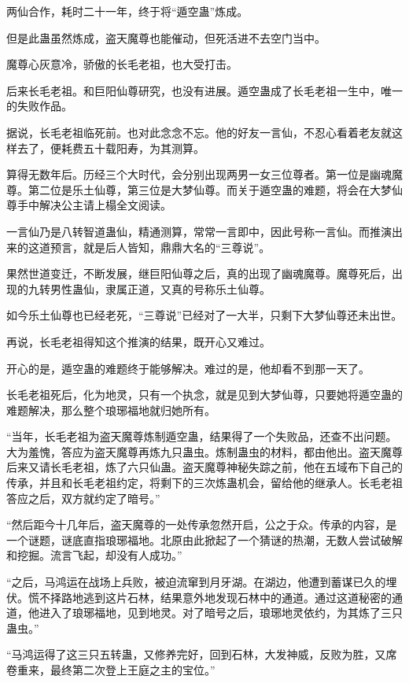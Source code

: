 \begin{this_body}
两仙合作，耗时二十一年，终于将“遁空蛊”炼成。

但是此蛊虽然炼成，盗天魔尊也能催动，但死活进不去空门当中。

魔尊心灰意冷，骄傲的长毛老祖，也大受打击。

后来长毛老祖。和巨阳仙尊研究，也没有进展。遁空蛊成了长毛老祖一生中，唯一的失败作品。

据说，长毛老祖临死前。也对此念念不忘。他的好友一言仙，不忍心看着老友就这样去了，便耗费五十载阳寿，为其测算。

算得无数年后。历经三个大时代，会分别出现两男一女三位尊者。第一位是幽魂魔尊。第二位是乐土仙尊，第三位是大梦仙尊。而关于遁空蛊的难题，将会在大梦仙尊手中解决公主请上榻全文阅读。

一言仙乃是八转智道蛊仙，精通测算，常常一言即中，因此号称一言仙。而推演出来的这道预言，就是后人皆知，鼎鼎大名的“三尊说”。

果然世道变迁，不断发展，继巨阳仙尊之后，真的出现了幽魂魔尊。魔尊死后，出现的九转男性蛊仙，隶属正道，又真的号称乐土仙尊。

如今乐土仙尊也已经老死，“三尊说”已经对了一大半，只剩下大梦仙尊还未出世。

再说，长毛老祖得知这个推演的结果，既开心又难过。

开心的是，遁空蛊的难题终于能够解决。难过的是，他却看不到那一天了。

长毛老祖死后，化为地灵，只有一个执念，就是见到大梦仙尊，只要她将遁空蛊的难题解决，那么整个琅琊福地就归她所有。

“当年，长毛老祖为盗天魔尊炼制遁空蛊，结果得了一个失败品，还查不出问题。大为羞愧，答应为盗天魔尊再炼九只蛊虫。炼制蛊虫的材料，都由他出。盗天魔尊后来又请长毛老祖，炼了六只仙蛊。盗天魔尊神秘失踪之前，他在五域布下自己的传承，并且和长毛老祖约定，将剩下的三次炼蛊机会，留给他的继承人。长毛老祖答应之后，双方就约定了暗号。”

“然后距今十几年后，盗天魔尊的一处传承忽然开启，公之于众。传承的内容，是一个谜题，谜底直指琅琊福地。北原由此掀起了一个猜谜的热潮，无数人尝试破解和挖掘。流言飞起，却没有人成功。”

“之后，马鸿运在战场上兵败，被迫流窜到月牙湖。在湖边，他遭到蓄谋已久的埋伏。慌不择路地逃到这片石林，结果意外地发现石林中的通道。通过这道秘密的通道，他进入了琅琊福地，见到地灵。对了暗号之后，琅琊地灵依约，为其炼了三只蛊虫。”

“马鸿运得了这三只五转蛊，又修养完好，回到石林，大发神威，反败为胜，又席卷重来，最终第二次登上王庭之主的宝位。”


\end{this_body}
